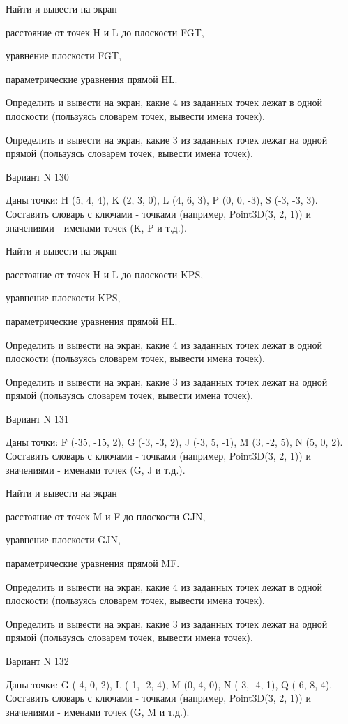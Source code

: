 \documentclass[11pt]{report}
\begin{document}
Найти и вывести на экран


расстояние от точек H и L до плоскости FGT,


уравнение плоскости FGT,


параметрические уравнения прямой HL.


Определить и вывести на экран, какие 4 из заданных точек лежат в одной плоскости (пользуясь словарем точек, вывести имена точек).


Определить и вывести на экран, какие 3 из заданных точек лежат на одной прямой (пользуясь словарем точек, вывести имена точек).

\newpage
Вариант N 130

Даны точки: H (5, 4, 4), K (2, 3, 0), L (4, 6, 3), P (0, 0, -3), S (-3, -3, 3).
Составить словарь с ключами - точками (например, Point3D(3, 2, 1)) и значениями - именами точек (K, P и т.д.).


Найти и вывести на экран


расстояние от точек H и L до плоскости KPS,


уравнение плоскости KPS,


параметрические уравнения прямой HL.


Определить и вывести на экран, какие 4 из заданных точек лежат в одной плоскости (пользуясь словарем точек, вывести имена точек).


Определить и вывести на экран, какие 3 из заданных точек лежат на одной прямой (пользуясь словарем точек, вывести имена точек).

\newpage
Вариант N 131

Даны точки: F (-35, -15, 2), G (-3, -3, 2), J (-3, 5, -1), M (3, -2, 5), N (5, 0, 2).
Составить словарь с ключами - точками (например, Point3D(3, 2, 1)) и значениями - именами точек (G, J и т.д.).


Найти и вывести на экран


расстояние от точек M и F до плоскости GJN,


уравнение плоскости GJN,


параметрические уравнения прямой MF.


Определить и вывести на экран, какие 4 из заданных точек лежат в одной плоскости (пользуясь словарем точек, вывести имена точек).


Определить и вывести на экран, какие 3 из заданных точек лежат на одной прямой (пользуясь словарем точек, вывести имена точек).

\newpage
Вариант N 132

Даны точки: G (-4, 0, 2), L (-1, -2, 4), M (0, 4, 0), N (-3, -4, 1), Q (-6, 8, 4).
Составить словарь с ключами - точками (например, Point3D(3, 2, 1)) и значениями - именами точек (G, M и т.д.).
\end{document}
